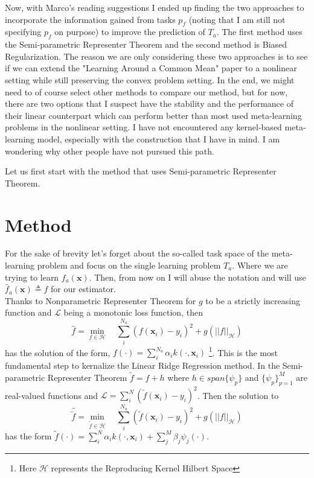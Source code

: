 \documentclass{tran-l}
\theoremstyle{definition}
\theoremstyle{remark}
\numberwithin{equation}{section}
\begin{document}
\rem Now, with Marco's reading suggestions I ended up finding the two approaches to incorporate the information gained from tasks $p_f$ (noting that I am still not specifying $p_f$ on purpose) to improve the prediction of $T_a$. The first method uses the Semi-parametric Representer Theorem and the second method is Biased Regularization. \color{red} The reason we are only considering these two approaches is to see if we can extend the "Learning Around a Common Mean" paper to a nonlinear setting while still preserving the convex problem setting. In the end, we might need to of course select other methods to compare our method, but for now, there are two options that I suspect have the stability and the performance of their linear counterpart which can perform better than most used meta-learning problems in the nonlinear setting. I have not encountered any kernel-based meta-learning model, especially with the construction that I have in mind. I am wondering why other people have not pursued this path.{\color{black}

Let us first start with the method that uses Semi-parametric Representer Theorem. 

\section{Method}

\rem For the sake of brevity let's forget about the so-called task space of the meta-learning problem and focus on the single learning problem $T_a$. Where we are trying to learn $f_a(\mathbf{x})$. Then, from now on I will abuse the notation and will use $\hat{f}_a(\mathbf{x})\triangleq f $ for our estimator. \\

Thanks to Nonparametric Representer Theorem for $g$ to be a strictly increasing function and $\mathcal{L}$ being a monotonic loss function, then 
\begin{equation}
  \hat{f} = \min_{f\in\mathcal{H}}\quad \sum_i^{N_a}(f(\mathbf{x}_i)-y_i)^2 + g(||f||_\mathcal{H})
\end{equation} 
has the solution of the form, $f(\cdot)=\sum^{N_a}_i\alpha_i k(\cdot,\mathbf{x}_i)$ \footnote{Here $\mathcal{H}$ represents the Reproducing Kernel Hilbert Space}. This is the most fundamental step to kernalize the Linear Ridge Regression method.
In the Semi-parametric Representer Theorem  $\tilde{f}= f + h$ where $h\in span\{\psi_p\}$ and $\{\psi_p\}_{p=1}^M$ are real-valued functions and $\mathcal{L}=\sum_i^N(\tilde{f}(\mathbf{x}_i)-y_i)^2$. Then the solution to 
\begin{equation}
\hat{\tilde{f}} = \min_{\tilde{f}\in\mathcal{H}}\quad\sum_i^{N_a}(\tilde{f}(\mathbf{x}_i)-y_i)^2 + g(||f||_\mathcal{H})
\end{equation}  
has the form $\tilde{f}(\cdot)=\sum^N_i\alpha_i k(\cdot,\mathbf{x}_i)+\sum_j^M\beta_j\psi_j(\cdot).$

}
\end{document}
